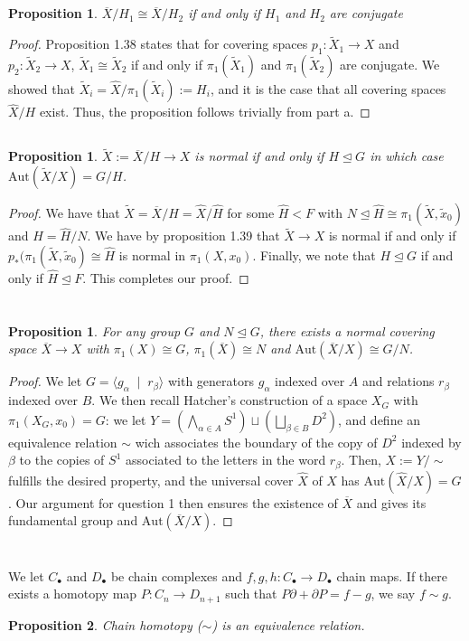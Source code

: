 \documentclass[english]{article}
\newcommand{\prob}[1]{\setcounter{section}{#1-1}\section{}}
\newcommand{\prt}[1]{\setcounter{subsection}{#1-1}\subsection{}}
\newtheorem{proposition}[theorem]{Proposition}
\newtheorem*{proposition*}{Proposition}
\theoremstyle{remark}
\theoremstyle{definition}
\newcommand{\oX}{\overline{X}}
\newcommand{\tX}{\tilde{X}}
\newcommand{\tx}{\tilde{x}}
\newcommand{\hX}{\hat{X}}
\newcommand{\aut}{\mathrm{Aut}}
\newcommand{\del}{\partial}
\begin{document}
\prt{2}
\begin{proposition}
	$\oX/H_1\cong \oX/H_2$ if and only if $H_1$ and $H_2$ are conjugate
\end{proposition}
\begin{proof}
Proposition 1.38 states that for covering spaces $p_1:\tX_1\to X$ and $p_2:\tX_2\to X$, $\tX_1\cong \tX_2$ if and only if $\pi_1(\tX_1)$ and $\pi_1(\tX_2)$ are conjugate. We showed that $\tX_i=\hX/\pi_1(\tX_i):=H_i$, and it is the case that all covering spaces $\hX/H$ exist. Thus, the proposition follows trivially from part a.
\end{proof}
\prt{3}
\begin{proposition}
	$\tX:=\oX/H\to X$ is normal if and only if $H\unlhd G$ in which case $\aut(\tX/X)=G/H$. 
\end{proposition}
\begin{proof}
	We have that $\tX=\oX/H=\hX/\hat{H}$ for some $\hat{H}<F$ with $N\unlhd \hat{H}\cong \pi_1(\tX,\tx_0)$ and $H=\hat{H}/N$. We have by proposition 1.39 that $\tX\to X$ is normal if and only if $p_*(\pi_1(\tX,\tx_0)\cong \hat{H}$ is normal in $\pi_1(X,x_0)$. Finally, we note that $H\unlhd G$ if and only if $\hat{H}\unlhd F$. This completes our proof.
\end{proof}
\prob{2}
\begin{proposition*}
	For any group $G$ and $N\unlhd G$, there exists a normal covering space $\oX\to X$ with $\pi_1(X)\cong G$, $\pi_1(\oX)\cong N$ and $\aut(\oX/X)\cong G/N$.
\end{proposition*}
\begin{proof}
We let $G=\langle g_\alpha \;\mid \;r_\beta \rangle$ with generators $g_\alpha$ indexed over $A$ and relations $r_\beta$ indexed over $B$. We then recall Hatcher's construction of a space $X_G$ with $\pi_1(X_G,x_0)=G$: we let $Y=\left(\bigwedge_{\alpha\in A} S^1\right) \sqcup \left(\bigsqcup_{\beta\in B} D^2\right)$, and define an equivalence relation $\sim$ wich associates the boundary of the copy of $D^2$ indexed by $\beta$ to the copies of $S^1$ associated to the letters in the word $r_\beta$. Then, $X:=Y/\sim$ fulfills the desired property, and the universal cover $\hX$ of $X$ has $\aut(\hX/X)=G$. Our argument for question 1 then ensures the existence of $\oX$ and gives its fundamental group and $\aut(\oX/X)$.
\end{proof}
\prob{3}	We let $C_\bullet $ and $D_\bullet$ be chain complexes and $f,g,h:C_\bullet\to D_{\bullet}$ chain maps. If there exists a homotopy map $P:C_n\to D_{n+1}$ such that $P\del+\del P=f-g$, we say $f\sim g$.
\begin{proposition*}
	Chain homotopy ($\sim$) is an equivalence relation.
\end{proposition*}
\end{document}
